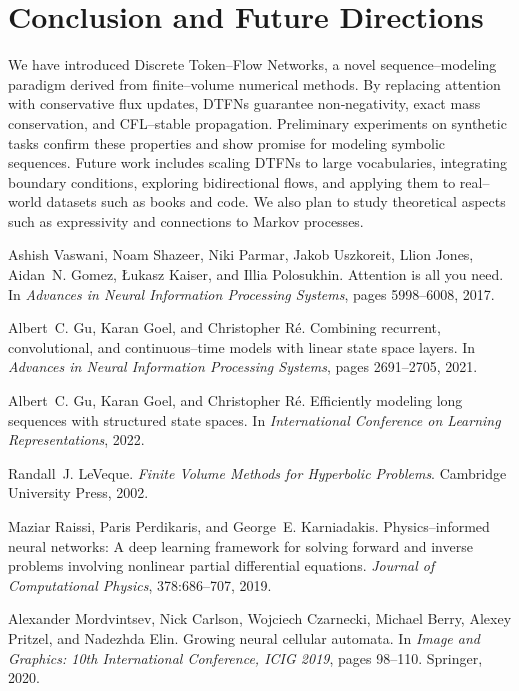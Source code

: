 \documentclass[10pt]{article}
\begin{document}
\section{Conclusion and Future Directions}
We have introduced Discrete Token–Flow Networks, a novel sequence–modeling
paradigm derived from finite–volume numerical methods. By replacing attention
with conservative flux updates, DTFNs guarantee non‑negativity, exact mass
conservation, and CFL–stable propagation. Preliminary experiments on synthetic
tasks confirm these properties and show promise for modeling symbolic
sequences. Future work includes scaling DTFNs to large vocabularies,
integrating boundary conditions, exploring bidirectional flows, and
applying them to real–world datasets such as books and code. We also
plan to study theoretical aspects such as expressivity and connections to
Markov processes.


\begin{thebibliography}{10}

Ashish Vaswani, Noam Shazeer, Niki Parmar, Jakob Uszkoreit, Llion Jones,
Aidan~N. Gomez, \L{}ukasz Kaiser, and Illia Polosukhin.
\newblock Attention is all you need.
\newblock In \emph{Advances in Neural Information Processing Systems}, pages
  5998--6008, 2017.

Albert~C. Gu, Karan Goel, and Christopher R{\'e}.
\newblock Combining recurrent, convolutional, and continuous--time models with
  linear state space layers.
\newblock In \emph{Advances in Neural Information Processing Systems}, pages
  2691--2705, 2021.

Albert~C. Gu, Karan Goel, and Christopher R{\'e}.
\newblock Efficiently modeling long sequences with structured state spaces.
\newblock In \emph{International Conference on Learning Representations}, 2022.

Randall~J. LeVeque.
\newblock \emph{Finite Volume Methods for Hyperbolic Problems}.
\newblock Cambridge University Press, 2002.

Maziar Raissi, Paris Perdikaris, and George~E. Karniadakis.
\newblock Physics--informed neural networks: A deep learning framework for
  solving forward and inverse problems involving nonlinear partial
  differential equations.
\newblock \emph{Journal of Computational Physics}, 378:686--707, 2019.

Alexander Mordvintsev, Nick Carlson, Wojciech Czarnecki, Michael Berry,
  Alexey Pritzel, and Nadezhda Elin.
\newblock Growing neural cellular automata.
\newblock In \emph{Image and Graphics: 10th International Conference, ICIG
  2019}, pages 98--110. Springer, 2020.

\end{thebibliography}
\end{document}
